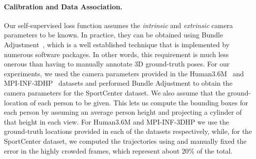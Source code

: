 \documentclass[runningheads]{llncs}
\begin{document}
\paragraph{Calibration and Data Association.}

Our self-supervised loss function assumes the \emph{intrinsic} and \emph{extrinsic} camera parameters to be known. In practice, they can be  obtained using Bundle Adjustment~\cite{Triggs00}, which is a well established technique that is implemented by numerous software packages. In other words, this requirement is much less onerous than having to manually annotate 3D ground-truth poses. For our experiments, we used the camera parameters provided in the Human3.6M~\cite{Ionescu14a} and MPI-INF-3DHP~\cite{Mehta17a} datasets and performed Bundle Adjustment to obtain the camera parameters for the SportCenter dataset. We also assume that the ground-location of each person to be given. This lets us compute the bounding boxes for each person by assuming an average person height and projecting a cylinder of that height in each view. For Human3.6M and MPI-INF-3DHP we use the ground-truth locations provided in each of the datasets respectively, while, for the SportCenter dataset, we computed the trajectories using \cite{Lenz15b,Wang19f} and manually fixed the error in the highly crowded frames, which represent about 20\% of the total.
\end{document}

